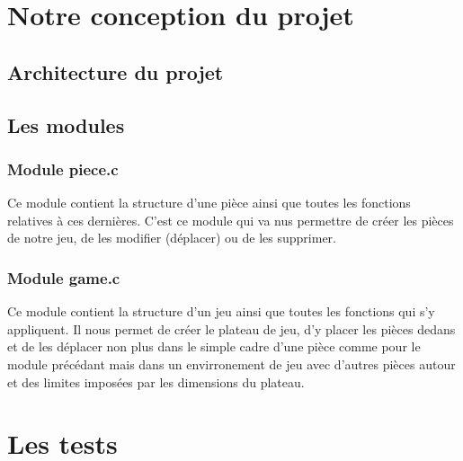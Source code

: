 \documentclass{report}
\begin{document}
\chapter{Notre conception du projet}
\setcounter{section}{0}
\section{Architecture du projet}

\section{Les modules}
\subsection*{Module piece.c}
Ce module contient la structure d'une pièce ainsi que toutes les fonctions relatives à ces dernières. C'est ce module qui va nus permettre de créer les pièces de notre jeu, de les modifier (déplacer) ou de les supprimer.
\subsection*{Module game.c}
Ce module contient la structure d'un jeu ainsi que toutes les fonctions qui s'y appliquent. Il nous permet de créer le plateau de jeu, d'y placer les pièces dedans et de les déplacer non plus dans le simple cadre d'une pièce comme pour le module précédant mais dans un envirronement de jeu avec d'autres pièces autour et des limites imposées par les dimensions du plateau.



\chapter{Les tests}
\setcounter{section}{0}
\end{document}
